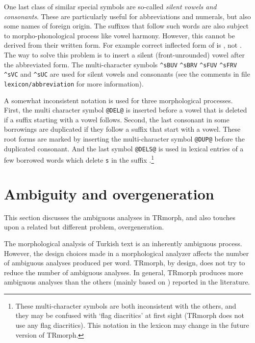 \documentclass[twocolumn]{article}
\begin{document}
One last class of similar special symbols are so-called \emph{silent
vowels and consonants}. These are particularly useful for
abbreviations and numerals, but also some names of foreign origin. The
suffixes that follow such words are also subject to
morpho-phonological process like vowel harmony. However, this cannot
be derived from their written form. For example correct inflected form
of  is , not . The
way to solve this problem is to insert a silent (front-unrounded)
vowel after the abbreviated form. The multi-character symbols
\texttt{\^{}sBUV} \texttt{\^{}sBRV} \texttt{\^{}sFUV} \texttt{\^{}sFRV}
\texttt{\^{}sVC} and \texttt{\^{}sUC} are used for silent vowels and
consonants (see the comments in file \lstinline{lexicon/abbreviation}
for more information).

A somewhat inconsistent notation is used for three morphological
processes. First, the multi character symbol \texttt{@DEL@} is
inserted before a vowel that is deleted if a suffix starting with a
vowel follows. Second, the last consonant in some borrowings are
duplicated if they follow a suffix that start with a vowel. These root
forms are marked by inserting the multi-character symbol
\texttt{@DUP@} before the duplicated consonant. And the last symbol
\texttt{@DELS@} is used in lexical entries of a few borrowed words
which delete \texttt{s} in the suffix .\footnote{These
multi-character symbols are both inconsistent with the others, and
they may be confused with `flag diacritics' at first sight (TRmorph 
does not use any flag diacritics). This notation in the lexicon may
change in the future version of TRmorph.}


\section{\label{sec:ambiguity}Ambiguity and overgeneration}

This section
discusses the ambiguous analyses in TRmorph, and also touches upon a
related but different problem, overgeneration.

The morphological analysis of Turkish text is an inherently ambiguous
process. However, the design choices made in a morphological analyzer
affects the number of ambiguous analyses produced per word.  TRmorph,
by design, does not try to reduce the number of ambiguous analyses. In
general, TRmorph produces more ambiguous analyses than the others
(mainly based on \textcite{oflazer1994}) reported in the literature. 
\end{document}
